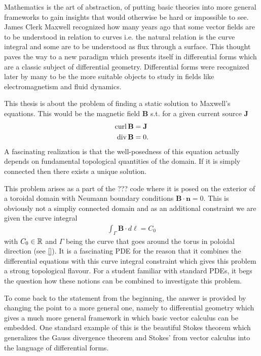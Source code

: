\documentclass[../master_thesis.tex]{subfiles}
\begin{document}
Mathematics is the art of abstraction, of putting basic theories into more 
general frameworks to gain insights that would otherwise be hard or 
impossible to see. James Clerk Maxwell recognized how many years ago that some
vector fields are to be understood in relation to curves 
i.e. the natural relation is the curve integral and some are to be understood 
as flux through a surface. This thought paves the way to a new paradigm 
which presents itself in differential forms which are a classic 
subject of differential geometry. Differential forms were recognized later by many to be the more suitable objects 
to study in fields like electromagnetism \cite{} and 
fluid dynamics. 

This thesis is about the problem of finding a static solution to Maxwell's equations.
This would be the magnetic field $\mathbf{B}$ s.t. for a given current source 
$\mathbf{J}$ 
\begin{align*}
    \operatorname{curl} \mathbf{B} &= \mathbf{J} 
    \\ \operatorname{div} \mathbf{B} &= 0.
\end{align*}
A fascinating realization is that the well-posedness of this equation actually 
depends on fundamental topological quantities of the domain. If it is simply 
connected then there exists a unique solution.

This problem arises as a part of the ??? code where it is posed on the 
exterior of a toroidal domain with Neumann boundary conditions 
$\mathbf{B} \cdot \mathbf{n} = 0$. This is obviously not a simpliy connected domain 
and as an additional constraint we are 
given the curve integral 
\begin{align*}
    \int_\Gamma \mathbf{B}\cdot d\ell = C_0
\end{align*}
with $C_0 \in \mathbb{R}$ and $\Gamma$ being the curve that goes around the torus 
in poloidal direction (see \ref{}). 
It is a fascinating PDE for the reason that it combines the differential 
equations with this curve integral constraint which gives this problem 
a strong topological flavour. For a student familiar with standard PDEs, it 
begs the question how these notions can be combined to investigate this problem.

To come back to the statement from the beginning, the answer is provided 
by changing the point to a more general one, namely to differential geometry which
gives a much more general framework in which basic vector calculus can 
be embedded. One standard example of this is the beautiful Stokes theorem 
which generalizes the Gauss divergence theorem and Stokes' from vector calculus 
into the language of differential forms.
\end{document}

